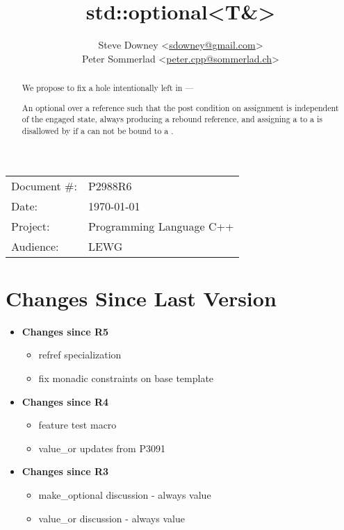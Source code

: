 \documentclass[a4paper,10pt,oneside,openany,final,article]{memoir}
\begin{document}
\title{std::optional<T\&>}
\author{
  Steve Downey \small<\href{mailto:sdowney@gmail.com}{sdowney@gmail.com}> \\
  Peter Sommerlad \small<\href{mailto:peter.cpp@sommerlad.ch}{peter.cpp@sommerlad.ch}> \\
}
\date{} %
\maketitle

\begin{flushright}
  \begin{tabular}{ll}
    Document \#: & P2988R6 \\
    Date: & \today \\
    Project: & Programming Language C++ \\
    Audience: & LEWG
  \end{tabular}
\end{flushright}

\begin{abstract}
  We propose to fix a hole intentionally left in  ---

  An optional over a reference such that the post condition on assignment is independent of the engaged state, always producing a rebound reference, and assigning a  to a  is disallowed by  if a  can not be bound to a .
\end{abstract}

\tableofcontents*

\chapter*{Changes Since Last Version}

\begin{itemize}
  \item \textbf{Changes since R5}
  \begin{itemize}
  \item refref specialization
  \item fix monadic constraints on base template
  \end{itemize}
\item \textbf{Changes since R4}
  \begin{itemize}
  \item feature test macro
  \item value_or updates from P3091
  \end{itemize}
\item \textbf{Changes since R3}
  \begin{itemize}
  \item make_optional discussion - always value
  \item value_or discussion - always value
  \end{itemize}
\end{itemize}
\end{document}
